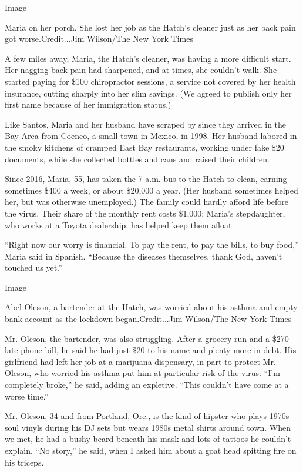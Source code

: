 Image

Maria on her porch. She lost her job as the Hatch's cleaner just as her
back pain got worse.Credit...Jim Wilson/The New York Times

A few miles away, Maria, the Hatch's cleaner, was having a more
difficult start. Her nagging back pain had sharpened, and at times, she
couldn't walk. She started paying for \$100 chiropractor sessions, a
service not covered by her health insurance, cutting sharply into her
slim savings. (We agreed to publish only her first name because of her
immigration status.)

Like Santos, Maria and her husband have scraped by since they arrived in
the Bay Area from Coeneo, a small town in Mexico, in 1998. Her husband
labored in the smoky kitchens of cramped East Bay restaurants, working
under fake \$20 documents, while she collected bottles and cans and
raised their children.

Since 2016, Maria, 55, has taken the 7 a.m. bus to the Hatch to clean,
earning sometimes \$400 a week, or about \$20,000 a year. (Her husband
sometimes helped her, but was otherwise unemployed.) The family could
hardly afford life before the virus. Their share of the monthly rent
costs \$1,000; Maria's stepdaughter, who works at a Toyota dealership,
has helped keep them afloat.

``Right now our worry is financial. To pay the rent, to pay the bills,
to buy food,'' Maria said in Spanish. ``Because the diseases themselves,
thank God, haven't touched us yet.''

Image

Abel Oleson, a bartender at the Hatch, was worried about his asthma and
empty bank account as the lockdown began.Credit...Jim Wilson/The New
York Times

Mr. Oleson, the bartender, was also struggling. After a grocery run and
a \$270 late phone bill, he said he had just \$20 to his name and plenty
more in debt. His girlfriend had left her job at a marijuana dispensary,
in part to protect Mr. Oleson, who worried his asthma put him at
particular risk of the virus. ``I'm completely broke,'' he said, adding
an expletive. ``This couldn't have come at a worse time.''

Mr. Oleson, 34 and from Portland, Ore., is the kind of hipster who plays
1970s soul vinyls during his DJ sets but wears 1980s metal shirts around
town. When we met, he had a bushy beard beneath his mask and lots of
tattoos he couldn't explain. ``No story,'' he said, when I asked him
about a goat head spitting fire on his triceps.

